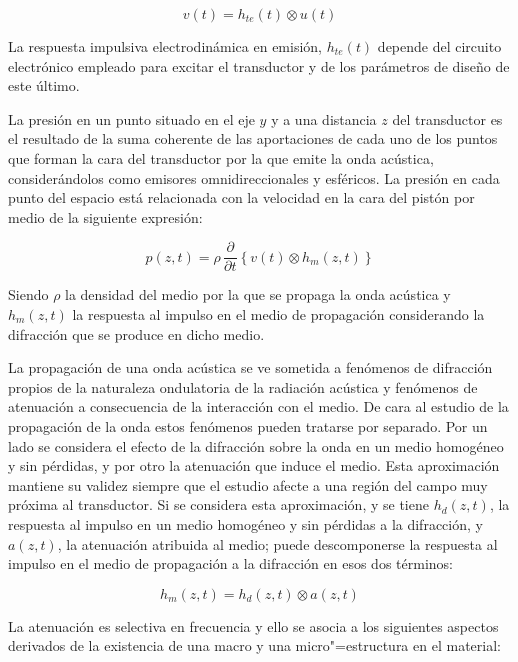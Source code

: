\begin{equation}
	v(t) = h_{te}(t)\otimes u(t)
	\label{eq:emiter}
\end{equation}

La respuesta impulsiva electrodinámica en emisión, $h_{te}(t)$ depende del circuito electrónico empleado para excitar el transductor y de los parámetros de diseño de este último.\par
La presión en un punto situado en el eje $y$ y a una distancia $z$ del transductor es el resultado de la suma coherente de las aportaciones de cada uno de los puntos que forman la cara del transductor por la que emite la onda acústica, considerándolos como emisores omnidireccionales y esféricos. La presión en cada punto del espacio está relacionada con la velocidad en la cara del pistón por medio de la siguiente expresión:

\begin{equation}
	p(z, t) = \rho\,\frac{\partial}{\partial t}\left\{v(t)\otimes h_{m}(z, t)\right\}
	\label{eq:diffracpressure}
\end{equation}

Siendo $\rho$ la densidad del medio por la que se propaga la onda acústica y $h_{m}(z, t)$ la respuesta al impulso en el medio de propagación considerando la difracción que se produce en dicho medio.\par
La propagación de una onda acústica se ve sometida a fenómenos de difracción propios de la naturaleza ondulatoria de la radiación acústica y fenómenos de atenuación a consecuencia de la interacción con el medio. De cara al estudio de la propagación de la onda estos fenómenos pueden tratarse por separado. Por un lado se considera el efecto de la difracción sobre la onda en un medio homogéneo y sin pérdidas, y por otro la atenuación que induce el medio. Esta aproximación mantiene su validez siempre que el estudio afecte a una región del campo muy próxima al transductor. Si se considera esta aproximación, y se tiene $h_d(z, t)$, la respuesta al impulso en un medio homogéneo y sin pérdidas a la difracción, y $a(z, t)$, la atenuación atribuida al medio; puede descomponerse la respuesta al impulso en el medio de propagación a la difracción en esos dos términos:

\begin{equation}
	h_m(z, t) = h_d(z, t)\otimes a(z, t)
	\label{eq:diffraction}
\end{equation}

La atenuación es selectiva en frecuencia y ello se asocia a los siguientes aspectos derivados de la existencia de una macro y una micro"=estructura en el material:

